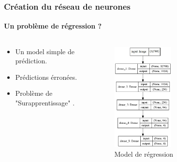 
\begin{frame}
\frametitle{Création du réseau de neurones}
\framesubtitle{Un problème de régression ?}
\begin{columns}
\begin{column}{6.5cm}
    \begin{itemize}
        \item<1->   Un model simple de prédiction.
        \item<2->   Prédictions érronées.
        \item<2->   Problème de "Surapprentissage" .
    \end{itemize}
\end{column}
\begin{column}{6cm}
    \begin{figure}
        \begin{overprint}
            \centering\includegraphics[width=0.5\textwidth]{figures/Model_1.PNG}\caption{Model de régression}

\end{overprint}
\end{figure}
\end{column}
\end{columns}
\end{frame}
